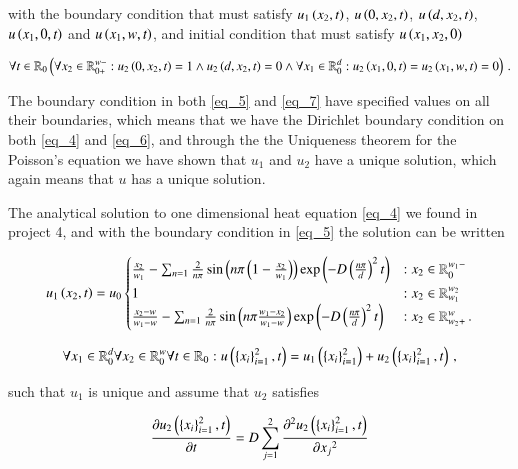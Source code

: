 \documentclass[11pt,english,a4paper]{article}
\begin{document}
\begin{flushleft}
with the boundary condition that must satisfy $u_1\left({x_2,t}\right)$, $u\left({0,x_2,t}\right)$, $u\left({d,x_2,t}\right)$, $u\left({x_1,0,t}\right)$ and $u\left({x_1,w,t}\right)$,  and initial condition that must satisfy $u\left({x_1,x_2,0}\right)$

\begin{align}
\forall t \in \mathbb{R}_0 \left({\forall x_2 \in \mathbb{R}_{0+}^{w-}: u_2\left({0,x_2,t}\right) = 1 \wedge u_2\left({d,x_2,t}\right)=0 \wedge \forall x_1\in \mathbb{R}_0^d: u_2\left({x_1,0,t}\right) = u_2\left({x_1,w,t}\right)= 0}\right) \,.
\label{eq_7}
\end{align}

The boundary condition in both \eqref{eq_5} and \eqref{eq_7} have specified values on all their boundaries, which means that we have the Dirichlet boundary condition on both \eqref{eq_4} and \eqref{eq_6}, and through the the Uniqueness theorem for the Poisson's equation we have shown that $u_1$ and $u_2$ have a unique solution, which again means that $u$ has a unique solution. \linebreak

The analytical solution to one dimensional heat equation \eqref{eq_4} we found in project 4, and with the boundary condition in \eqref{eq_5} the solution can be written

\begin{align}
u_1\left({x_2,t}\right) = u_0 \begin{cases} \frac{x_2}{w_1} - \sum_{n=1} \frac{2}{n \pi} \sin\left({n\pi\left({1-\frac{x_2}{w_1}}\right)}\right)\exp\left({-D\left({\frac{n\pi}{d}}\right)^2 t}\right) &: x_2\in\mathbb{R}_0^{w_1-}\\ 1 &: x_2 \in\mathbb{R}_{w_1}^{w_2} \\  \frac{x_2-w}{w_1-w} - \sum_{n=1} \frac{2}{n \pi} \sin\left({n\pi\frac{w_1-x_2}{w_1-w}}\right)\exp\left({-D\left({\frac{n\pi}{d}}\right)^2 t}\right) & : x_2\in\mathbb{R}_{w_2+}^w \,.\end{cases}
\label{eq_8}
\end{align}

\begin{align}
\forall x_1 \in \mathbb{R}_0^d \forall x_2 \in \mathbb{R}_0^w \forall t \in \mathbb{R}_{0}: u\left({\left\lbrace{x_i}\right\rbrace_{i=1}^2,t}\right) = u_1\left({\left\lbrace{x_i}\right\rbrace_{i=1}^2}\right) + u_2\left({\left\lbrace{x_i}\right\rbrace_{i=1}^2,t}\right) \,,
\label{eq_9}
\end{align}

such that $u_1$ is unique and assume  that $u_2$ satisfies

\begin{align}
\frac{\partial u_2\left({\left\lbrace{x_i}\right\rbrace_{i=1}^2,t}\right)}{\partial t} = D\sum_{j=1}^2\frac{\partial^2 u_2\left({\left\lbrace{x_i}\right\rbrace_{i=1}^2,t}\right)}{\partial {x_j}^2}
\label{eq_10}
\end{align}


\end{flushleft}
\end{document}

